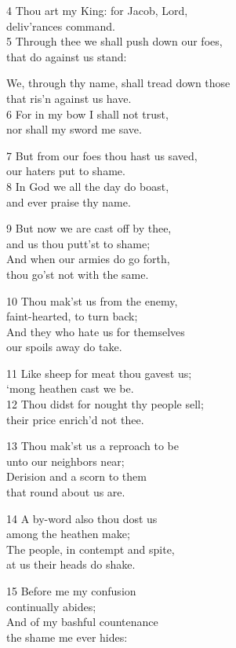 \begin{multicols}{3}
4 Thou art my King: for Jacob, Lord,\\
deliv’rances command.\\
5 Through thee we shall push down our foes,\\
that do against us stand:

We, through thy name, shall tread down those\\
that ris’n against us have.\\
6 For in my bow I shall not trust,\\
nor shall my sword me save.

7 But from our foes thou hast us saved,\\
our haters put to shame.\\
8 In God we all the day do boast,\\
and ever praise thy name.

9 But now we are cast off by thee,\\
and us thou putt’st to shame;\\
And when our armies do go forth,\\
thou go’st not with the same.

10 Thou mak’st us from the enemy,\\
faint-hearted, to turn back;\\
And they who hate us for themselves\\
our spoils away do take.

11 Like sheep for meat thou gavest us;\\
‘mong heathen cast we be.\\
12 Thou didst for nought thy people sell;\\
their price enrich’d not thee.

13 Thou mak’st us a reproach to be\\
unto our neighbors near;\\
Derision and a scorn to them\\
that round about us are.

14 A by-word also thou dost us\\
among the heathen make;\\
The people, in contempt and spite,\\
at us their heads do shake.

15 Before me my confusion\\
continually abides;\\
And of my bashful countenance\\
the shame me ever hides:


\end{multicols}
